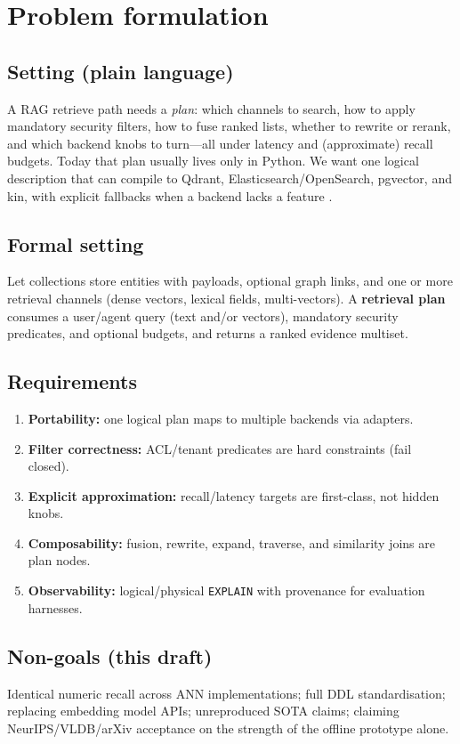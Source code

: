 \section{Problem formulation}
\label{sec:problem}

\subsection{Setting (plain language)}
A RAG retrieve path needs a \emph{plan}: which channels to search, how to apply mandatory security filters, how to fuse ranked lists, whether to rewrite or rerank, and which backend knobs to turn---all under latency and (approximate) recall budgets.
Today that plan usually lives only in Python.
We want one logical description that can compile to Qdrant, Elasticsearch/OpenSearch, pgvector, and kin, with explicit fallbacks when a backend lacks a feature \hypothesis{}.

\subsection{Formal setting}
Let collections store entities with payloads, optional graph links, and one or more retrieval channels (dense vectors, lexical fields, multi-vectors).
A \textbf{retrieval plan} consumes a user/agent query (text and/or vectors), mandatory security predicates, and optional budgets, and returns a ranked evidence multiset.

\subsection{Requirements}
\begin{enumerate}[leftmargin=*]
  \item \textbf{Portability:} one logical plan maps to multiple backends via adapters.
  \item \textbf{Filter correctness:} ACL/tenant predicates are hard constraints (fail closed).
  \item \textbf{Explicit approximation:} recall/latency targets are first-class, not hidden knobs.
  \item \textbf{Composability:} fusion, rewrite, expand, traverse, and similarity joins are plan nodes.
  \item \textbf{Observability:} logical/physical \texttt{EXPLAIN} with provenance for evaluation harnesses.
\end{enumerate}

\subsection{Non-goals (this draft)}
Identical numeric recall across ANN implementations; full DDL standardisation; replacing embedding model APIs; unreproduced SOTA claims; claiming NeurIPS/VLDB/arXiv acceptance on the strength of the offline prototype alone.

